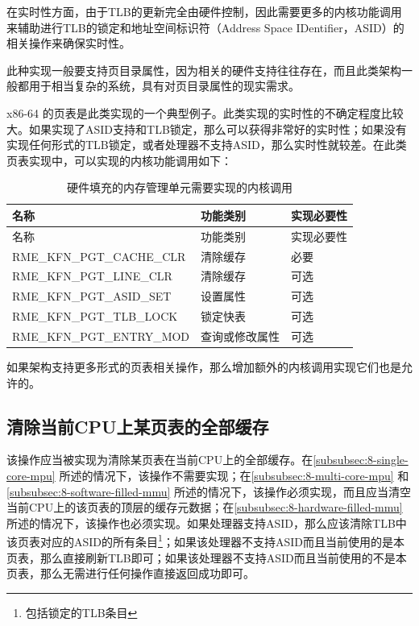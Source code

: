 在实时性方面，由于TLB的更新完全由硬件控制，因此需要更多的内核功能调用来辅助进行TLB的锁定和地址空间标识符（Address
Space IDentifier，ASID）的相关操作来确保实时性。

此种实现一般要支持页目录属性，因为相关的硬件支持往往存在，而且此类架构一般都用于相当复杂的系统，具有对页目录属性的现实需求。

x86-64 的页表是此类实现的一个典型例子。此类实现的实时性的不确定程度比较大。如果实现了ASID支持和TLB锁定，那么可以获得非常好的实时性；如果没有实现任何形式的TLB锁定，或者处理器不支持ASID，那么实时性就较差。在此类页表实现中，可以实现的内核功能调用如下：

\begin{xltabular}{\textwidth}{@{}>{\hsize\raggedright\arraybackslash}X>{\hsize\raggedright\arraybackslash}X>{\hsize\raggedright\arraybackslash}X@{}}
\caption{硬件填充的内存管理单元需要实现的内核调用}\label{tab:8-4-kernel-calls-required-by-hardware-filled-mmu}\\
\toprule
名称 & 功能类别 & 实现必要性\tabularnewline
\endfirsthead
\toprule
名称 & 功能类别 & 实现必要性\tabularnewline
\midrule
\endhead
\bottomrule
\endlastfoot
RME\_KFN\_PGT\_CACHE\_CLR & 清除缓存 & 必要\tabularnewline
RME\_KFN\_PGT\_LINE\_CLR & 清除缓存 & 可选\tabularnewline
RME\_KFN\_PGT\_ASID\_SET & 设置属性 & 可选\tabularnewline
RME\_KFN\_PGT\_TLB\_LOCK & 锁定快表 & 可选\tabularnewline
RME\_KFN\_PGT\_ENTRY\_MOD & 查询或修改属性 & 可选\tabularnewline
\end{xltabular}

如果架构支持更多形式的页表相关操作，那么增加额外的内核调用实现它们也是允许的。

\subsection{清除当前CPU上某页表的全部缓存}\label{subsec:8-clear-all-page-table-cache}

该操作应当被实现为清除某页表在当前CPU上的全部缓存。在\ref{subsubsec:8-single-core-mpu}
所述的情况下，该操作不需要实现；在\ref{subsubsec:8-multi-core-mpu}
和\ref{subsubsec:8-software-filled-mmu}
所述的情况下，该操作必须实现，而且应当清空当前CPU上的该页表的顶层的缓存元数据；在\ref{subsubsec:8-hardware-filled-mmu}
所述的情况下，该操作也必须实现。如果处理器支持ASID，那么应该清除TLB中该页表对应的ASID的所有条目\footnote{包括锁定的TLB条目}；如果该处理器不支持ASID而且当前使用的是本页表，那么直接刷新TLB即可；如果该处理器不支持ASID而且当前使用的不是本页表，那么无需进行任何操作直接返回成功即可。


